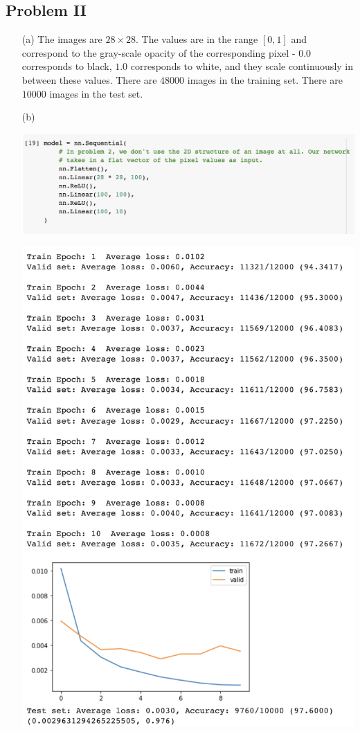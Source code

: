 \documentclass[11pt]{scrartcl}
\begin{document}
\newpage

\subsection{Problem II}
\begin{itemize}
\item[(a)] The images are $28 \times 28$.  The values are in the range $[0, 1]$ and correspond to the gray-scale opacity of the corresponding pixel - $0.0$ corresponds to black, $1.0$ corresponds to white, and they scale continuously in between these values.  There are $48000$ images in the training set.  There are $10000$ images in the test set.  
\item[(b)]
\begin{center}
\includegraphics[scale=0.5]{model.png}
\end{center}

\begin{center}
\includegraphics[scale=0.5]{results.png}
\end{center}


\end{itemize}
\end{document}
